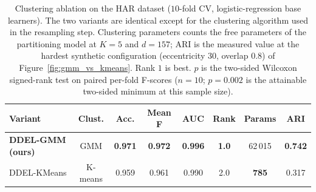 \begin{table}[!t]
			\begin{center}
				\caption{Clustering ablation on the HAR dataset ($10$-fold CV, logistic-regression base learners). The two variants are identical except for the clustering algorithm used in the resampling step. Clustering parameters counts the free parameters of the partitioning model at $K=5$ and $d=157$; ARI is the measured value at the hardest synthetic configuration (eccentricity $30$, overlap $0.8$) of Figure~\ref{fig:gmm_vs_kmeans}. Rank $1$ is best. $p$ is the two-sided Wilcoxon signed-rank test on paired per-fold F-scores ($n=10$; $p=0.002$ is the attainable two-sided minimum at this sample size).}
				\label{tab:clustering_ablation}
				\setlength{\tabcolsep}{2pt}
				\begin{tabular}{|l|c|c|c|c|c|c|c|}
					\hline
					\textbf{Variant} & \textbf{Clust.} & \textbf{Acc.} & \textbf{Mean F} & \textbf{AUC} & \textbf{Rank} & \textbf{Params} & \textbf{ARI} \\
					\hline
					\textbf{DDEL-GMM (ours)} & GMM & \textbf{0.971} & \textbf{0.972} & \textbf{0.996} & \textbf{1.0} & 62\,015 & \textbf{0.742} \\
					\hline
					DDEL-KMeans & K-means & 0.959 & 0.961 & 0.990 & 2.0 & \textbf{785} & 0.317 \\
					\hline
				\end{tabular}
			\end{center}
		\end{table}
